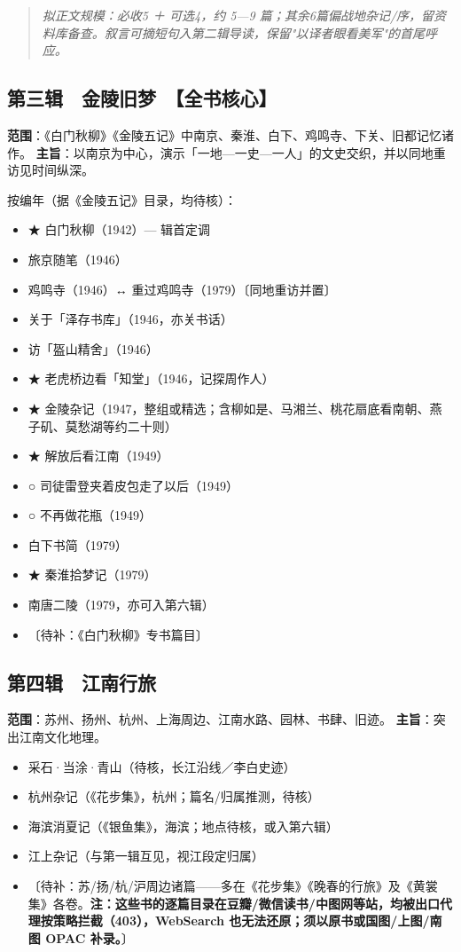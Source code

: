 \documentclass[UTF8,fontset=none,zihao=-4,a4paper]{ctexart}
\begin{document}
\begin{quote}\small\itshape
拟正文规模：必收5 ＋ 可选4，约 5—9 篇；其余6篇偏战地杂记/序，留资料库备查。叙言可摘短句入第二辑导读，保留"以译者眼看美军"的首尾呼应。
\end{quote}

\subsection{第三辑　金陵旧梦　【全书核心】}

\textbf{范围}：《白门秋柳》《金陵五记》中南京、秦淮、白下、鸡鸣寺、下关、旧都记忆诸作。 \textbf{主旨}：以南京为中心，演示「一地—一史—一人」的文史交织，并以同地重访见时间纵深。


按编年（据《金陵五记》目录，均待核）：

\begin{itemize}
\item ★ 白门秋柳（1942）— 辑首定调
\item 旅京随笔（1946）
\item 鸡鸣寺（1946）↔ 重过鸡鸣寺（1979）〔同地重访并置〕
\item 关于「泽存书库」（1946，亦关书话）
\item 访「盔山精舍」（1946）
\item ★ 老虎桥边看「知堂」（1946，记探周作人）
\item ★ 金陵杂记（1947，整组或精选；含柳如是、马湘兰、桃花扇底看南朝、燕子矶、莫愁湖等约二十则）
\item ★ 解放后看江南（1949）
\item ○ 司徒雷登夹着皮包走了以后（1949）
\item ○ 不再做花瓶（1949）
\item 白下书简（1979）
\item ★ 秦淮拾梦记（1979）
\item 南唐二陵（1979，亦可入第六辑）
\item 〔待补：《白门秋柳》专书篇目〕
\end{itemize}


\subsection{第四辑　江南行旅}

\textbf{范围}：苏州、扬州、杭州、上海周边、江南水路、园林、书肆、旧迹。 \textbf{主旨}：突出江南文化地理。


\begin{itemize}
\item 采石·当涂·青山（待核，长江沿线／李白史迹）
\item 杭州杂记（《花步集》，杭州；篇名/归属推测，待核）
\item 海滨消夏记（《银鱼集》，海滨；地点待核，或入第六辑）
\item 江上杂记（与第一辑互见，视江段定归属）
\item 〔待补：苏/扬/杭/沪周边诸篇——多在《花步集》《晚春的行旅》及《黄裳集》各卷。\textbf{注：这些书的逐篇目录在豆瓣/微信读书/中图网等站，均被出口代理按策略拦截（403），WebSearch 也无法还原；须以原书或国图/上图/南图 OPAC 补录。}〕
\end{itemize}
\end{document}
